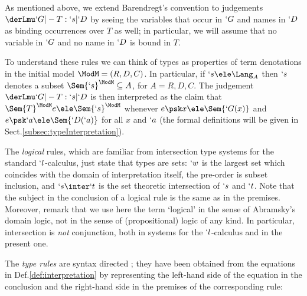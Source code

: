 \documentclass{CSML}
\begin{document}
As mentioned above, we extend Barendregt's convention to judgements $ \derLmu `G |- T : `s | `D $ by seeing the variables that occur in $`G$ and names in $`D $ as binding occurrences over $T$ as well; in particular, we will assume that no variable in $`G$ and no name in $`D $ is bound in $T$.

To understand these rules we can think of types as properties of term denotations in the 
initial model ${\ModM} = (R,D,C)$. In particular, if $`s \ele \Lang_A$ 
then $`s$ denotes a subset $\Sem{ `s }^{\ModM} \subseteq A$, for $A = R,D,C$. 
The judgement $ \derLmu `G |- T : `s | `D $ is then interpreted as the claim
that $\Sem{ T }^{\ModM}{ e } \ele \Sem{ `s }^{\ModM}$ whenever $e\psk x \ele \Sem{`G(x)}$ and $e\psk `a \ele \Sem{`D(`a)}$ for all $x$ and $`a$ (the formal definitions will be given in Sect.\skp\ref{subsec:typeInterpretation}).

The \emph{logical} rules, which are familiar from intersection type systems for the standard $`l$-calculus, just state that types are sets: $`w$ is the largest set which coincides with the domain of interpretation itself, the pre-order is subset inclusion, and $`s\inter`t$ is the set theoretic intersection of $`s$ and $`t$. 
Note that the subject in the conclusion of a logical rule is the same as in the premises. 
Moreover, remark that we use here the term `logical' in the sense of Abramsky's domain logic, not in the sense of (propositional) logic of any kind. 
In particular, intersection is \emph{not} conjunction, both in systems for the $`l$-calculus and in the present one.

The \emph{type rules} are syntax directed%
; they have been obtained from the equations in Def.\skp\ref{def:interpretation} by representing the left-hand side of the equation in the conclusion and the right-hand side in the premises of the corresponding rule:
\end{document}
